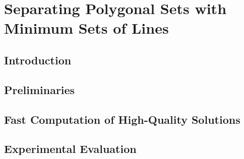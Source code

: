 \chapter{Separating Polygonal Sets with Minimum Sets of Lines}
\thispagestyle{myheadings}

\section{Introduction}
\label{sec:bf-intro}

\section{Preliminaries}\label{sec:bf-preliminary}


\label{sec:bf-structure}

\section{Fast Computation of High-Quality Solutions}\label{sec:bf-algorithm}


\section{Experimental Evaluation}\label{sec:bf-evaluation}

